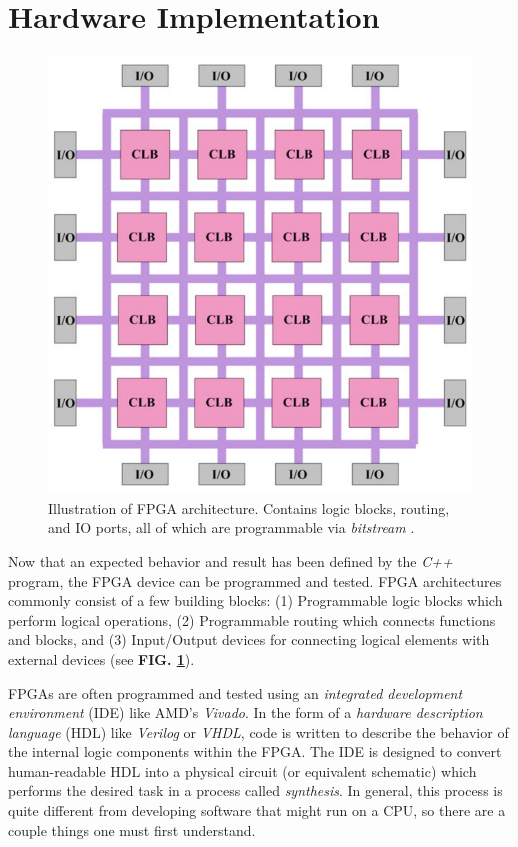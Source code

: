 \documentclass[reprint,amsmath,amssymb,aps,pra]{revtex4-2}
\begin{document}
\section{Hardware Implementation}

\begin{figure}
    \centering
    \includegraphics[width=0.6\linewidth]{figs/FPGA-arch.png}
    \caption{Illustration of FPGA architecture. Contains logic blocks, routing, and IO ports, all of which are programmable via \textit{bitstream} \cite{Farooq2012}.}
    \label{fig:fpga-arch}
\end{figure}

Now that an expected behavior and result has been defined by the \textit{C++} program, the FPGA device can be programmed and tested. FPGA architectures commonly consist of a few building blocks:
(1) Programmable logic blocks which perform logical operations, (2) Programmable routing which connects functions and blocks, and (3) Input/Output devices for connecting logical elements with external devices (see \textbf{FIG. \ref{fig:fpga-arch}}).

FPGAs are often programmed and tested using an \textit{integrated development environment} (IDE) like AMD's \textit{Vivado}. In the form of a \textit{hardware description language} (HDL) like \textit{Verilog} or \textit{VHDL}, code is written to describe the behavior of the internal logic components within the FPGA. The IDE is designed to convert human-readable HDL into a physical circuit (or equivalent schematic) which performs the desired task in a process called \textit{synthesis}. In general, this process is quite different from developing software that might run on a CPU, so there are a couple things one must first understand.
\end{document}
